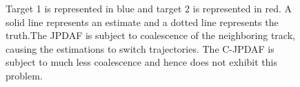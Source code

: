 \documentclass[letterpaper, 10pt, conference]{ieeeconf}
\begin{document}
\begin{figure}
\centerline{
	}
\centerline{
	}
\centerline{
	}
\caption{Target 1 is represented in blue and target 2 is represented in red. A solid line represents an estimate and a dotted line represents the truth.The JPDAF is subject to coalescence of the neighboring track, causing the estimations to switch trajectories. The C-JPDAF is subject to much less coalescence and hence does not exhibit this problem.}
\label{AllAlgorithms}
\end{figure}
\end{document}
